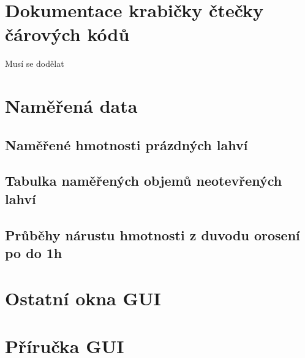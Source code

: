 
\chapter{Dokumentace krabičky čtečky čárových kódů}

Musí se dodělat

\chapter{Naměřená data}

\section{Naměřené hmotnosti prázdných lahví}

\section{Tabulka naměřených objemů neotevřených lahví}

\section{Průběhy nárustu hmotnosti z duvodu orosení po do 1h}

\chapter{Ostatní okna GUI}
\chapter{Příručka GUI}
